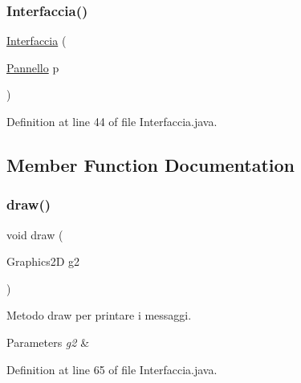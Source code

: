 \subsubsection{\texorpdfstring{Interfaccia()}{Interfaccia()}}
{\footnotesize\ttfamily \hyperlink{classa_1_1survival_1_1game_1_1_interfaccia}{Interfaccia} (\begin{DoxyParamCaption}\item[{\hyperlink{classa_1_1survival_1_1game_1_1_pannello}{Pannello}}]{p }\end{DoxyParamCaption})}



Definition at line 44 of file Interfaccia.\+java.



\subsection{Member Function Documentation}
\mbox{\label{classa_1_1survival_1_1game_1_1_interfaccia_ae8c972c0fb4fcbc09c2219dd32cbd053}} 
\subsubsection{\texorpdfstring{draw()}{draw()}}
{\footnotesize\ttfamily void draw (\begin{DoxyParamCaption}\item[{Graphics2D}]{g2 }\end{DoxyParamCaption})}



Metodo draw per printare i messaggi. 


\begin{DoxyParams}{Parameters}
{\em g2} & \\
\hline
\end{DoxyParams}


Definition at line 65 of file Interfaccia.\+java.

